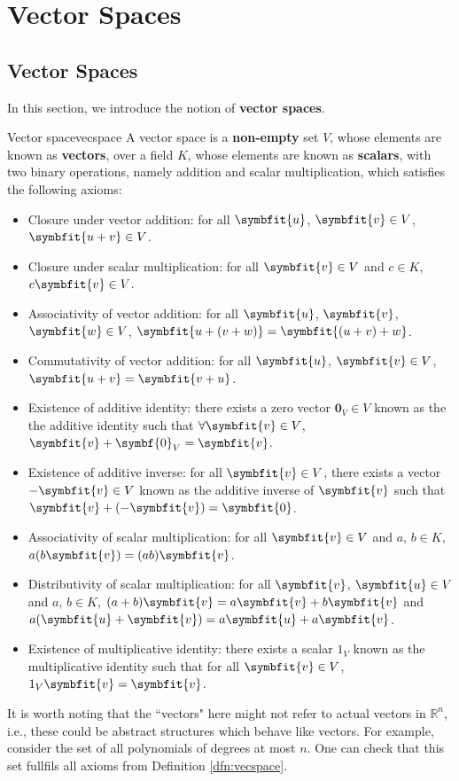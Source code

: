 \documentclass[math]{amznotes}
\theoremstyle{remark}
\begin{document}
\tableofcontents
\chapter{Vector Spaces}
\section{Vector Spaces}
In this section, we introduce the notion of \textbf{vector spaces}.
\begin{dfnbox}{Vector space}{vecspace}
    A vector space is a {\color{red} \textbf{non-empty}} set $V$, whose elements are known as {\color{red} \textbf{vectors}}, over a field $K$, whose elements are known as {\color{red} \textbf{scalars}}, with two binary operations, namely addition and scalar multiplication, which satisfies the following axioms:
    \begin{itemize}
        \item Closure under vector addition: for all $\symbfit{u}$, $\symbfit{v} \in V$, $\symbfit{u + v} \in V$.
        \item Closure under scalar multiplication: for all $\symbfit{v} \in V$ and $c \in K$, $c\symbfit{v} \in V$.
        \item Associativity of vector addition: for all $\symbfit{u}$, $\symbfit{v}$, $\symbfit{w} \in V$, $\symbfit{u + (v + w)} = \symbfit{(u + v) + w}$.
        \item Commutativity of vector addition: for all $\symbfit{u}$, $\symbfit{v} \in V$, $\symbfit{u + v} = \symbfit{v + u}$.
        \item Existence of additive identity: there exists a zero vector $\symbf{0}_V \in V$ known as the the additive identity such that $\forall \symbfit{v} \in V$, $\symbfit{v} + \symbf{0}_V = \symbfit{v}$.
        \item Existence of additive inverse: for all $\symbfit{v} \in V$, there exists a vector $-\symbfit{v} \in V$ known as the additive inverse of $\symbfit{v}$ such that $\symbfit{v} + (-\symbfit{v}) = \symbfit{0}$.
        \item Associativity of scalar multiplication: for all $\symbfit{v} \in V$ and $a$, $b \in K$, $a(b\symbfit{v}) = (ab)\symbfit{v}$.
        \item Distributivity of scalar multiplication: for all $\symbfit{v}$, $\symbfit{u} \in V$ and $a$, $b \in K$, $(a + b)\symbfit{v} = a\symbfit{v} + b\symbfit{v}$ and $a(\symbfit{u} + \symbfit{v}) = a\symbfit{u} + a\symbfit{v}$.
        \item Existence of multiplicative identity: there exists a scalar $1_V$ known as the multiplicative identity such that for all $\symbfit{v} \in V$, $1_V \symbfit{v} = \symbfit{v}$.
    \end{itemize}
\end{dfnbox}
It is worth noting that the ``vectors" here might not refer to actual vectors in $\mathbb{R}^n$, i.e., these could be abstract structures which behave like vectors. For example, consider the set of all polynomials of degrees at most $n$. One can check that this set fullfils all axioms from Definition \ref{dfn:vecspace}.
\end{document}
